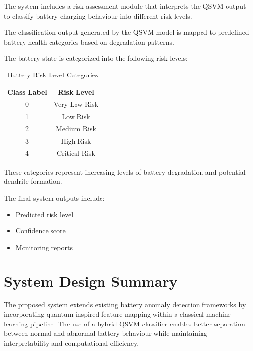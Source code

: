 The system includes a risk assessment module that interprets the QSVM output to classify battery charging behaviour into different risk levels.

The classification output generated by the QSVM model is mapped to predefined battery health categories based on degradation patterns.

The battery state is categorized into the following risk levels:

\begin{table}[h]
\centering
\caption{Battery Risk Level Categories}
\begin{tabular}{|c|c|}
\hline
Class Label & Risk Level \\
\hline
0 & Very Low Risk \\
1 & Low Risk \\
2 & Medium Risk \\
3 & High Risk \\
4 & Critical Risk \\
\hline
\end{tabular}
\end{table}

These categories represent increasing levels of battery degradation and potential dendrite formation.

The final system outputs include:

\begin{itemize}
\item Predicted risk level
\item Confidence score
\item Monitoring reports
\end{itemize}


\section{System Design Summary}

The proposed system extends existing battery anomaly detection frameworks by incorporating quantum-inspired feature mapping within a classical machine learning pipeline. The use of a hybrid QSVM classifier enables better separation between normal and abnormal battery behaviour while maintaining interpretability and computational efficiency.